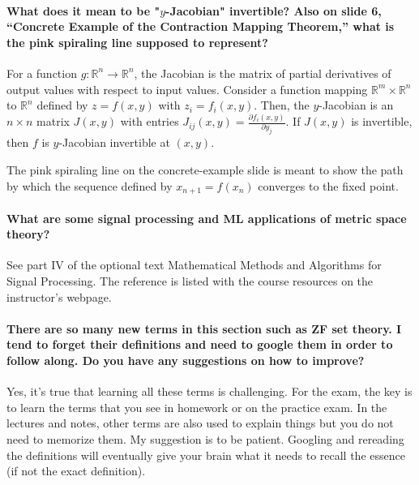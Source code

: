 \documentclass[10pt,english]{article}
\begin{document}
\paragraph{What does it mean to be "$y$-Jacobian" invertible? Also on slide 6, ``Concrete Example of the Contraction Mapping Theorem,'' what is the pink spiraling line supposed to represent?}
For a function $g \colon \mathbb{R}^n \to \mathbb{R}^n$, the Jacobian is the matrix of partial derivatives of output values with respect to input values.
Consider a function mapping $\mathbb{R}^m \times \mathbb{R}^n$ to $\mathbb{R}^n$ defined by $z = f (x,y)$ with $z_i = f_i (x,y)$.
Then, the $y$-Jacobian is an $n\times n$ matrix $J (x,y)$ with entries $J_{ij} (x,y) = \frac{\partial f_i (x,y)}{\partial y_j}$.
If $J(x,y)$ is invertible, then $f$ is $y$-Jacobian invertible at $(x,y)$.


The pink spiraling line on the concrete-example slide is meant to show the path by which the sequence defined by $x_{n+1} = f(x_n)$ converges to the fixed point.


\paragraph{What are some signal processing and ML applications of metric space theory?}

See part IV of the optional text Mathematical Methods and Algorithms for Signal Processing.
The reference is listed with the course resources on the instructor's webpage.

\paragraph{There are so many new terms in this section such as ZF set theory. I tend to forget their definitions and need to google them in order to follow along. Do you have any suggestions on how to improve?}

Yes, it's true that learning all these terms is challenging.
For the exam, the key is to learn the terms that you see in homework or on the practice exam.
In the lectures and notes, other terms are also used to explain things but you do not need to memorize them.
My suggestion is to be patient.
Googling and rereading the definitions will eventually give your brain what it needs to recall the essence (if not the exact definition).
\end{document}
